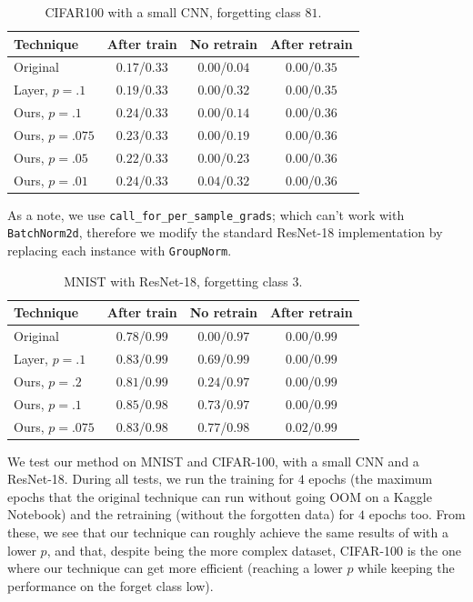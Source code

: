 \documentclass{article}
\begin{document}
\begin{table}
    \centering
    \caption{CIFAR100 with a small CNN, forgetting class $81$.}
    \label{tab:cifar_small_cnn}
    \begin{tabular}{l | c | c c}
        Technique&After train&No retrain&After retrain\\
        \hline
        Original&$0.17$/$0.33$&$0.00$/$0.04$&$0.00$/$0.35$\\
        Layer, $p=.1$&$0.19$/$0.33$&$0.00$/$0.32$&$0.00$/$0.35$\\
        \hline
        Ours, $p=.1$&$0.24$/$0.33$&$0.00$/$0.14$&$0.00$/$0.36$\\
        Ours, $p=.075$&$0.23$/$0.33$&$0.00$/$0.19$&$0.00$/$0.36$\\
        Ours, $p=.05$&$0.22$/$0.33$&$0.00$/$0.23$&$0.00$/$0.36$\\
        Ours, $p=.01$&$0.24$/$0.33$&$0.04$/$0.32$&$0.00$/$0.36$\\
    \end{tabular}
\end{table}

As a note, we use \texttt{call\_for\_per\_sample\_grads}; which can't work with \texttt{BatchNorm2d}, therefore we modify the standard ResNet-18 implementation by replacing each instance with \texttt{GroupNorm}.

\begin{table}
    \centering
    \caption{MNIST with ResNet-18, forgetting class $3$.}
    \label{tab:mnist_resnet}
    \begin{tabular}{l | c | c c}
        Technique&After train&No retrain&After retrain\\
        \hline
        Original&$0.78$/$0.99$&$0.00$/$0.97$&$0.00$/$0.99$\\
        Layer, $p=.1$&$0.83$/$0.99$&$0.69$/$0.99$&$0.00$/$0.99$\\
        \hline
        Ours, $p=.2$&$0.81$/$0.99$&$0.24$/$0.97$&$0.00$/$0.99$\\
        Ours, $p=.1$&$0.85$/$0.98$&$0.73$/$0.97$&$0.00$/$0.99$\\
        Ours, $p=.075$&$0.83$/$0.98$&$0.77$/$0.98$&$0.02$/$0.99$\\
    \end{tabular}
\end{table}

We test our method on MNIST and CIFAR-100, with a small CNN and a ResNet-18. During all tests, we run the training for $4$ epochs (the maximum epochs that the original technique can run without going OOM on a Kaggle Notebook) and the retraining (without the forgotten data) for $4$ epochs too.
From these, we see that our technique can roughly achieve the same results of \cite{gogineni2024efficient} with a lower $p$, and that, despite being the more complex dataset, CIFAR-100 is the one where our technique can get more efficient (reaching a lower $p$ while keeping the performance on the forget class low).
\end{document}
